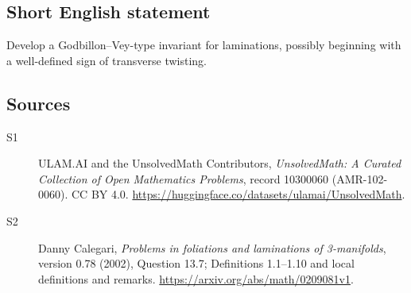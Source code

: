 \documentclass[11pt]{article}
\begin{document}
\subsection{Short English statement}
Develop a Godbillon--Vey-type invariant for laminations, possibly beginning with a well-defined sign of transverse twisting.
\subsection{Sources}
\begin{description}
\item[\hypertarget{source:10300060:1}{S1}] ULAM.AI and the UnsolvedMath Contributors, \emph{UnsolvedMath: A Curated Collection of Open Mathematics Problems}, record 10300060 (AMR-102-0060). CC BY 4.0. \url{https://huggingface.co/datasets/ulamai/UnsolvedMath}.
\item[\hypertarget{source:10300060:2}{S2}] Danny Calegari, \emph{Problems in foliations and laminations of 3-manifolds}, version 0.78 (2002), Question 13.7; Definitions 1.1--1.10 and local definitions and remarks. \url{https://arxiv.org/abs/math/0209081v1}.
\end{description}
\label{end:10300060}
\end{document}
